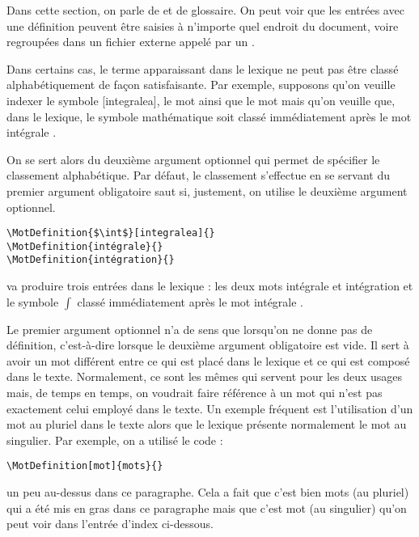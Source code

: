\documentclass[nocrop]{sesamanuel}
\begin{document}
Dans cette section, on parle de  et de
glossaire.
\vfill\clearpage
On peut voir que les entrées avec une définition peuvent être saisies
à n'importe quel endroit du document, voire regroupées dans un fichier
externe appelé par un .

\begin{remarque}
Dans certains cas, le terme apparaissant dans le lexique ne peut pas
être classé alphabétiquement de façon satisfaisante. Par exemple,
supposons qu'on veuille indexer le symbole
\MotDefinition{$\int$}[integralea]{}, le mot
 ainsi que le mot
 mais qu'on veuille que, dans le lexique,
le symbole mathématique soit classé immédiatement après le mot \og
intégrale \fg{}. 

On se sert alors du deuxième argument optionnel qui
permet de spécifier le classement alphabétique. Par défaut, le
classement s'effectue en se servant du premier argument obligatoire
saut si, justement, on utilise le deuxième argument optionnel. 
\end{remarque}

\begin{code}
\begin{verbatim}
\MotDefinition{$\int$}[integralea]{}
\MotDefinition{intégrale}{}
\MotDefinition{intégration}{}
\end{verbatim}
\end{code}
va produire trois entrées dans le lexique : les deux mots \og intégrale
\fg{} et \og intégration \fg{} et le symbole \og $\int$ \fg{} classé
immédiatement après le mot \og intégrale \fg{}.

Le premier argument optionnel n'a de sens que lorsqu'on ne donne pas
de définition, c'est-à-dire lorsque le deuxième argument obligatoire
est vide. Il sert à avoir un mot différent entre ce qui est placé dans
le lexique et ce qui est composé dans le texte. Normalement, ce sont
les mêmes  qui servent pour les deux usages
mais, de temps en temps, on voudrait faire référence à un mot qui
n'est pas exactement celui employé dans le texte. Un exemple fréquent
est l'utilisation d'un mot au pluriel dans le texte alors que le
lexique présente normalement le mot au singulier. Par exemple, on a
utilisé le code :
\begin{verbatim}
\MotDefinition[mot]{mots}{}
\end{verbatim}
un peu au-dessus dans ce paragraphe. Cela a fait que c'est bien \og
mots \fg{} (au pluriel) qui a été mis en gras dans ce paragraphe mais
que c'est \og mot \fg{} (au singulier) qu'on peut voir dans l'entrée
d'index ci-dessous.
\end{document}
